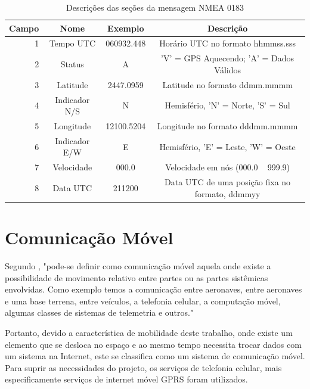 \begin{table}[!h]
\caption{Descrições das seções da mensagem NMEA 0183}
\centering
\begin{tabular}{|r|c|c|c|}
     \hline
		{\scriptsize \textbf{Campo}} &	{\scriptsize \textbf{Nome}} & {\scriptsize \textbf{Exemplo}} & {\scriptsize \textbf{Descrição}}\\
		\hline
		1 & {\scriptsize Tempo UTC} & {\scriptsize 060932.448} & {\scriptsize Horário UTC no formato hhmmss.sss}\\
		\hline
		2 & {\scriptsize Status} & {\scriptsize A} & {\scriptsize 'V' = GPS Aquecendo; 'A' = Dados Válidos}\\
		\hline
		3 & {\scriptsize Latitude} & {\scriptsize 2447.0959} & {\scriptsize Latitude no formato ddmm.mmmm}\\
		\hline
		4 & {\scriptsize Indicador N/S} & {\scriptsize N} & {\scriptsize Hemisfério, 'N' = Norte, 'S' = Sul}\\
		\hline
		5 & {\scriptsize Longitude} & {\scriptsize 12100.5204} & {\scriptsize Longitude no formato dddmm.mmmm} \\
		\hline
		6 & {\scriptsize Indicador E/W}  & {\scriptsize E} & {\scriptsize Hemisfério, 'E' = Leste, 'W' = Oeste} \\
		\hline
		7 & {\scriptsize Velocidade}  & {\scriptsize 000.0} & {\scriptsize Velocidade em nós (000.0 ~ 999.9)} \\
		\hline
		8 & {\scriptsize Data UTC} & {\scriptsize 211200} & {\scriptsize Data UTC de uma posição fixa no formato, ddmmyy}\\
		\hline
	\end{tabular}
\end{table}

\section {Comunicação Móvel}

Segundo \textcite{inatel:1998}, "pode-se definir como comunicação móvel aquela onde existe a possibilidade de movimento relativo entre partes ou as partes sistêmicas envolvidas. Como exemplo temos a comunicação entre aeronaves, entre aeronaves e uma base terrena, entre veículos, a telefonia celular, a computação móvel, algumas classes de sistemas de telemetria e outros."

Portanto, devido a característica de mobilidade deste trabalho, onde existe um elemento que se desloca no espaço e ao mesmo tempo necessita trocar dados com um sistema na Internet, este se classifica como um sistema de comunicação móvel. Para suprir as necessidades do projeto, os serviços de telefonia celular, mais especificamente serviços de internet móvel GPRS foram utilizados.

